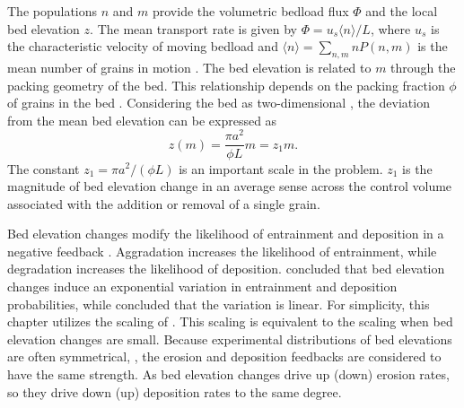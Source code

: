 The populations $n$ and $m$ provide the volumetric bedload flux $\Phi$ and the local bed elevation $z$.
The mean transport rate is given by $\Phi = u_s\langle n \rangle/L$, where $u_s$ is the characteristic velocity of moving bedload and $\langle n \rangle = 
\sum_{n,m}nP(n,m) $ is the mean number of grains in motion \citep{Charru2004, Ancey2008, Furbish2012a}.
The bed elevation is related to $m$ through the packing geometry of the bed.
This relationship depends on the packing fraction $\phi$ of grains in the bed \citep{Bennett1972}. Considering the bed as two-dimensional \citep{Einstein1950, Paintal1971}, the deviation from the mean bed elevation can be expressed as
\begin{equation} z(m) = \frac{\pi a^2}{\phi L}m = z_1 m. \label{eq:ele}\end{equation}
The constant $z_1 = \pi a^2/(\phi L)$ is an important scale in the problem. 
$z_1$ is the magnitude of bed elevation change in an average sense across the control volume associated with the addition or removal of a single grain.

Bed elevation changes modify the likelihood of entrainment and deposition in a negative feedback \citep{Sawai1987, Wong2007}.
Aggradation increases the likelihood of entrainment, while degradation increases the likelihood of deposition.
\citet{Wong2007} concluded that bed elevation changes induce an exponential variation in entrainment and deposition probabilities, while \citet{Sawai1987} concluded that the variation is linear.
For simplicity, this chapter utilizes the scaling of \citet{Sawai1987}. This scaling is equivalent to the  \citet{Wong2007} scaling when bed elevation changes are small.
Because experimental distributions of bed elevations are often symmetrical, \citep{Crickmore1962, Pender2001,Wong2007, Martin2014}, the erosion and deposition feedbacks are considered to have the same strength.
As bed elevation changes drive up (down) erosion rates, so they drive down (up) deposition rates to the same degree.

